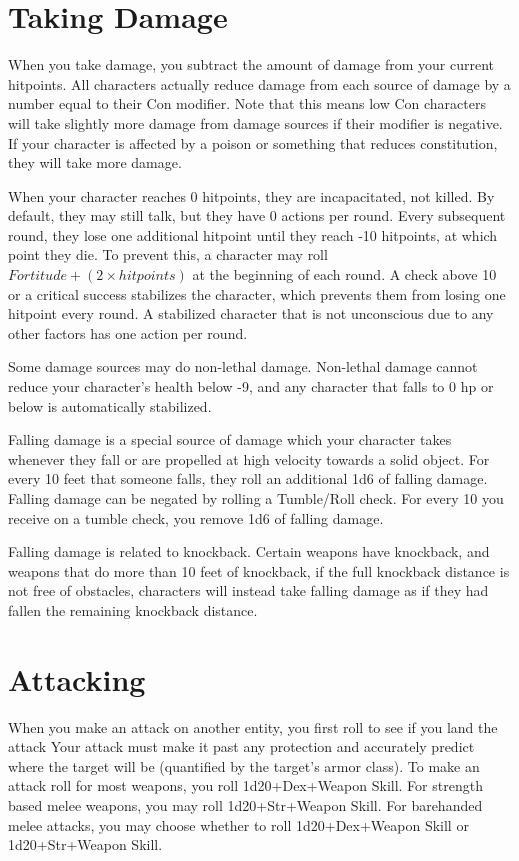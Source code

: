 \section{Taking Damage}
When you take damage, you subtract the amount of damage from your current hitpoints. All characters actually reduce damage from each source of damage by a number equal to their Con modifier. Note that this means low Con characters will take slightly more damage from damage sources if their modifier is negative. If your character is affected by a poison or something that reduces constitution, they will take more damage.

When your character reaches 0 hitpoints, they are incapacitated, not killed. By default, they may still talk, but they have 0 actions per round. Every subsequent round, they lose one additional hitpoint until they reach -10 hitpoints, at which point they die. To prevent this, a character may roll $Fortitude + (2 \times hitpoints)$ at the beginning of each round. A check above 10 or a critical success stabilizes the character, which prevents them from losing one hitpoint every round. A stabilized character that is not unconscious due to any other factors has one action per round.

Some damage sources may do non-lethal damage. Non-lethal damage cannot reduce your character’s health below -9, and any character that falls to 0 hp or below is automatically stabilized.

Falling damage is a special source of damage which your character takes whenever they fall or are propelled at high velocity towards a solid object. For every 10 feet that someone falls, they roll an additional 1d6 of falling damage. Falling damage can be negated by rolling a Tumble/Roll check. For every 10 you receive on a tumble check, you remove 1d6 of falling damage.

Falling damage is related to knockback. Certain weapons have knockback, and weapons that do more than 10 feet of knockback, if the full knockback distance is not free of obstacles, characters will instead take falling damage as if they had fallen the remaining knockback distance.

\section{Attacking}
When you make an attack on another entity, you first roll to see if you land the attack Your attack must make it past any protection and accurately predict where the target will be (quantified by the target’s armor class). To make an attack roll for most weapons, you roll 1d20+Dex+Weapon Skill. For strength based melee weapons, you may roll 1d20+Str+Weapon Skill. For barehanded melee attacks, you may choose whether to roll 1d20+Dex+Weapon Skill or 1d20+Str+Weapon Skill.

